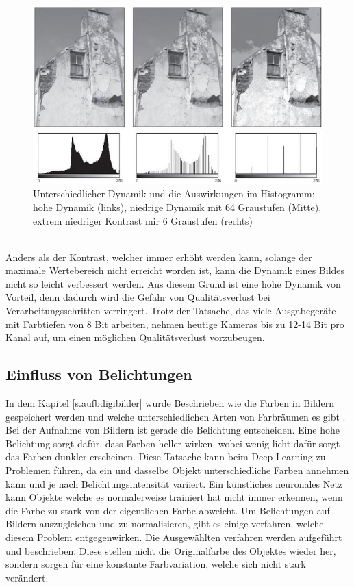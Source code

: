  \begin{figure}
    [h]
    \centering
    \includegraphics[scale=0.7]{Sources/dynamik.JPG}
    \caption{Unterschiedlicher Dynamik und die Auswirkungen im Histogramm: hohe Dynamik (links), niedrige Dynamik mit 64 Graustufen (Mitte), extrem niedriger Kontrast mir 6 Graustufen (rechts)\cite[45]{burger2009digitale}}
    \label{img:dynamik}
  \end{figure}\\
Anders als der Kontrast, welcher immer erhöht werden kann, solange der maximale Wertebereich nicht erreicht worden ist, kann die Dynamik eines Bildes nicht so leicht verbessert werden. Aus diesem Grund ist eine hohe Dynamik von Vorteil, denn dadurch wird die Gefahr von Qualitätsverlust bei Verarbeitungsschritten verringert. Trotz der Tatsache, das viele Ausgabegeräte mit Farbtiefen von 8 Bit arbeiten, nehmen heutige Kameras bis zu 12-14 Bit pro Kanal auf, um einen möglichen Qualitätsverlust vorzubeugen.
\subsection{Einfluss von Belichtungen}\label{s.belichtung}
In dem Kapitel \ref{s.aufbdigibilder} wurde Beschrieben wie die Farben in Bildern gespeichert werden und welche unterschiedlichen Arten von Farbräumen es gibt \cite[41ff.]{burger2009digitale}. Bei der Aufnahme von Bildern ist gerade die Belichtung entscheiden. Eine hohe Belichtung sorgt dafür, dass Farben heller wirken, wobei wenig licht dafür sorgt das Farben dunkler erscheinen. Diese Tatsache kann beim Deep Learning zu Problemen führen, da ein und dasselbe Objekt unterschiedliche Farben annehmen kann und je nach Belichtungsintensität variiert. Ein künstliches neuronales Netz kann Objekte welche es normalerweise trainiert hat nicht immer erkennen, wenn die Farbe zu stark von der eigentlichen Farbe abweicht. Um Belichtungen auf Bildern auszugleichen und zu normalisieren, gibt es einige verfahren, welche diesem Problem entgegenwirken. Die Ausgewählten verfahren werden aufgeführt und beschrieben. Diese stellen nicht die Originalfarbe des Objektes wieder her, sondern sorgen für eine konstante Farbvariation, welche sich nicht stark verändert.
